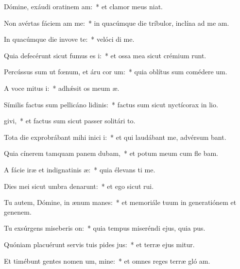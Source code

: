 \item Dómine, exáudi oratinem am:~* et clamor meus   niat.
\item Non avértas fáciem am  me:~* in quacúmque die tríbulor, inclína ad me  am.
\item In quacúmque die invove te:~* velóci di me.
\item Quia defecérunt sicut fumus es i:~* et ossa mea sicut crémium runt.
\item Percússus sum ut fœnum, et áru cor um:~* quia oblítus sum comédere  um.
\item A voce mitus i:~* adhǽsit os meum  æ.
\item Símilis factus sum pellicáno lidinis:~* factus sum sicut nyctícorax in lio.
\item {}givi,~* et factus sum sicut passer solitári  to.
\item Tota die exprobrábant mihi inici i:~* et qui laudábant me, advérsum  bant.
\item Quia cínerem tamquam panem dubam,~* et potum meum cum fle bam.
\item A fácie iræ et indignatinis æ:~* quia élevans ti me.
\item Dies mei sicut umbra denarunt:~* et ego sicut  rui.
\item Tu autem, Dómine, in ænum manes:~* et memoriále tuum in generatiónem et genenem.
\item Tu exsúrgens miseberis on:~* quia tempus miseréndi ejus, quia  pus.
\item Quóniam placuérunt servis tuis pides jus:~* et terræ ejus mitur.
\item Et timébunt gentes nomen um, mine:~* et omnes reges terræ gló am.

